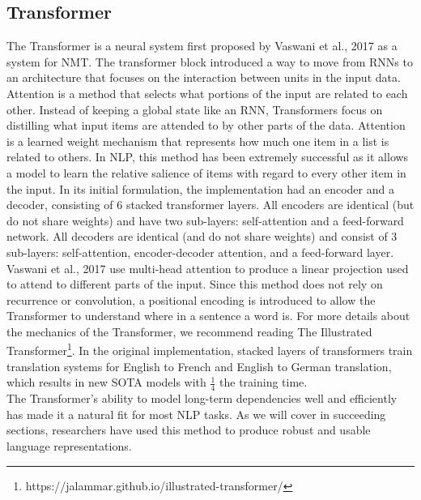 \subsection{Transformer}
\label{chap:prior:sec:arch:transformer}
The Transformer is a neural system first proposed by Vaswani et al., 2017  \cite{Vaswani2017AttentionIA} as a system for NMT. The transformer block introduced a way to move from RNNs to an architecture that focuses on the interaction between units in the input data. Attention is a method that selects what portions of the input are related to each other. Instead of keeping a global state like an RNN, Transformers focus on distilling what input items are attended to by other parts of the data. Attention is a learned weight mechanism that represents how much one item in a list is related to others. In NLP, this method has been extremely successful as it allows a model to learn the relative salience of items with regard to every other item in the input. In its initial formulation, the implementation had an encoder and a decoder, consisting of 6 stacked transformer layers. All encoders are identical (but do not share weights) and have two sub-layers: self-attention and a feed-forward network. All decoders are identical (and do not share weights) and consist of 3 sub-layers: self-attention, encoder-decoder attention, and a feed-forward layer. \\ 
Vaswani et al., 2017 use multi-head attention to produce a linear projection used to attend to different parts of the input. Since this method does not rely on recurrence or convolution, a positional encoding is introduced to allow the Transformer to understand where in a sentence a word is. For more details about the mechanics of the Transformer, we recommend reading The Illustrated Transformer\footnote{https://jalammar.github.io/illustrated-transformer/}. In the original implementation,  stacked layers of transformers train translation systems for English to French and English to German translation, which results in new SOTA models with $\frac{1}{4}$ the training time. \\
The Transformer's ability to model long-term dependencies well and efficiently has made it a natural fit for most NLP tasks. As we will cover in succeeding sections, researchers have used this method to produce robust and usable language representations.